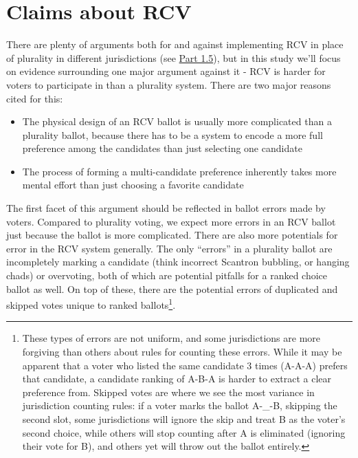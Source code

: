 \documentclass[12pt,twoside]{reedthesis}
\begin{document}
\hypertarget{claims-about-rcv}{%
\section{Claims about RCV}\label{claims-about-rcv}}

There are plenty of arguments both for and against implementing RCV in place of plurality in different jurisdictions (see \protect\hyperlink{rcv-args}{Part 1.5}), but in this study we'll focus on evidence surrounding one major argument against it - RCV is harder for voters to participate in than a plurality system. There are two major reasons cited for this:
\begin{itemize}
\item
  The physical design of an RCV ballot is usually more complicated than a plurality ballot, because there has to be a system to encode a more full preference among the candidates than just selecting one candidate
\item
  The process of forming a multi-candidate preference inherently takes more mental effort than just choosing a favorite candidate
\end{itemize}
The first facet of this argument should be reflected in ballot errors made by voters. Compared to plurality voting, we expect more errors in an RCV ballot just because the ballot is more complicated. There are also more potentials for error in the RCV system generally. The only ``errors'' in a plurality ballot are incompletely marking a candidate (think incorrect Scantron bubbling, or hanging chads) or overvoting, both of which are potential pitfalls for a ranked choice ballot as well. On top of these, there are the potential errors of duplicated and skipped votes unique to ranked ballots\footnote{These types of errors are not uniform, and some jurisdictions are more forgiving than others about rules for counting these errors. While it may be apparent that a voter who listed the same candidate 3 times (A-A-A) prefers that candidate, a candidate ranking of A-B-A is harder to extract a clear preference from. Skipped votes are where we see the most variance in jurisdiction counting rules: if a voter marks the ballot A-\_-B, skipping the second slot, some jurisdictions will ignore the skip and treat B as the voter's second choice, while others will stop counting after A is eliminated (ignoring their vote for B), and others yet will throw out the ballot entirely.}.
\end{document}
